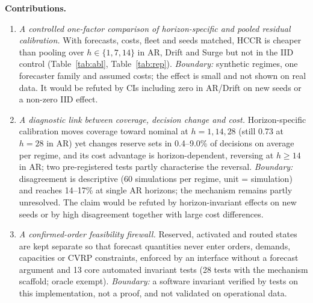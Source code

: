 \documentclass[conference]{IEEEtran}
\begin{document}
\textbf{Contributions.}
\begin{enumerate}
\item \emph{A controlled one-factor comparison of horizon-specific and pooled residual calibration.} With forecasts, costs, fleet and seeds matched, HCCR is cheaper than pooling over $h\in\{1,7,14\}$ in AR, Drift and Surge but not in the IID control (Table~\ref{tab:abl}, Table~\ref{tab:rep}). \emph{Boundary:} synthetic regimes, one forecaster family and assumed costs; the effect is small and not shown on real data. It would be refuted by CIs including zero in AR/Drift on new seeds or a non-zero IID effect.
\item \emph{A diagnostic link between coverage, decision change and cost.} Horizon-specific calibration moves coverage toward nominal at $h{=}1,14,28$ (still 0.73 at $h{=}28$ in AR) yet changes reserve sets in 0.4--9.0\% of decisions on average per regime, and its cost advantage is horizon-dependent, reversing at $h\ge14$ in AR; two pre-registered tests partly characterise the reversal. \emph{Boundary:} disagreement is descriptive (60 simulations per regime, unit = simulation) and reaches 14--17\% at single AR horizons; the mechanism remains partly unresolved. The claim would be refuted by horizon-invariant effects on new seeds or by high disagreement together with large cost differences.
\item \emph{A confirmed-order feasibility firewall.} Reserved, activated and routed states are kept separate so that forecast quantities never enter orders, demands, capacities or CVRP constraints, enforced by an interface without a forecast argument and 13 core automated invariant tests (28 tests with the mechanism scaffold; oracle exempt). \emph{Boundary:} a software invariant verified by tests on this implementation, not a proof, and not validated on operational data.
\end{enumerate}
\end{document}
